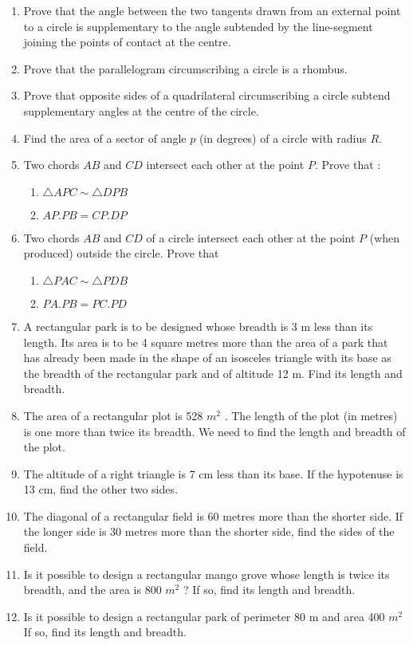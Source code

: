 \begin{enumerate}[label=\arabic*.,ref=\thesubsection.\theenumi]
\item Prove that the angle between the two tangents drawn from an external point to a circle is supplementary to the angle subtended by the line-segment joining the points of contact at the centre.
\item  Prove that the parallelogram circumscribing a circle is a rhombus.
%
\item Prove that opposite sides of a quadrilateral circumscribing a circle subtend supplementary angles at the centre of the circle.
%
\item Find the area of a sector of angle $p$ (in degrees) of a circle with radius $R$. 
\item  Two chords $AB$ and $CD$ intersect each other at the point $P$. Prove that : 
\begin{enumerate}
\item   $\triangle  APC  \sim   \triangle  DPB$
\item  $AP . PB = CP . DP$
\end{enumerate}
\item Two chords $AB$ and $CD$ of a circle intersect each other at the point $P$ (when produced) outside the circle. Prove that 
\begin{enumerate}
\item   $\triangle  PAC  \sim   \triangle  PDB$
\item  $PA . PB = PC . PD$
\end{enumerate}
\item A rectangular park is to be designed whose breadth is 3 m less than its length. Its area is to be 4 square metres more than the area of a park that has already been made in the shape of an isosceles triangle with its base as the breadth of the rectangular park and of altitude 12 m. Find its length and breadth.
\item The area of a rectangular plot is 528 $m^2$
. The length of the plot (in metres) is one more than twice its breadth. We need to find the length and breadth of the plot.
%
\item  The altitude of a right triangle is 7 cm less than its base. If the hypotenuse is 13 cm, find the other two sides.
%
\item The diagonal of a rectangular field is 60 metres more than the shorter side. If the longer side is 30 metres more than the shorter side, find the sides of the field.
\item Is it possible to design a rectangular mango grove whose length is twice its breadth, and the area is 800 $m^2$
? If so, find its length and breadth.
%
\item Is it possible to design a rectangular park of perimeter 80 m and area 400 $m^2$ If so, find  its length and breadth.

\end{enumerate}
